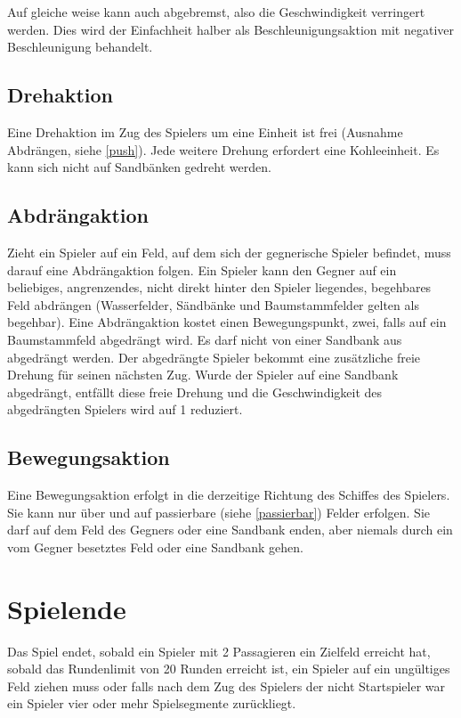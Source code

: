 \documentclass[12pt,a4paper, ngerman, oneside]{scrartcl}
\def\Rundenlimit/{20}
\begin{document}
Auf gleiche weise kann auch abgebremst, also die Geschwindigkeit verringert
werden. Dies wird der Einfachheit halber als Beschleunigungsaktion mit negativer
Beschleunigung behandelt.


\subsection{\label{turn}Drehaktion}

Eine Drehaktion im Zug des Spielers um eine Einheit ist frei (Ausnahme
Abdrängen, siehe \ref{push}). Jede weitere Drehung erfordert eine Kohleeinheit.
Es kann sich nicht auf Sandbänken gedreht werden.


\subsection{\label{push}Abdrängaktion}

Zieht ein Spieler auf ein Feld, auf dem sich der gegnerische Spieler befindet,
muss darauf eine Abdrängaktion folgen. Ein Spieler kann den Gegner auf ein
beliebiges, angrenzendes, nicht direkt hinter den Spieler liegendes, begehbares
Feld abdrängen (\label{passierbar}Wasserfelder, Sändbänke und Baumstammfelder
gelten als begehbar). Eine Abdrängaktion kostet einen Bewegungspunkt, zwei,
falls auf ein Baumstammfeld abgedrängt wird. Es darf nicht von einer Sandbank
aus abgedrängt werden. Der abgedrängte Spieler bekommt eine zusätzliche freie
Drehung für seinen nächsten Zug. Wurde der Spieler auf eine Sandbank abgedrängt,
entfällt diese freie Drehung und die Geschwindigkeit des abgedrängten Spielers
wird auf 1 reduziert.

\subsection{\label{step}Bewegungsaktion}

Eine Bewegungsaktion erfolgt in die derzeitige Richtung des Schiffes des
Spielers. Sie kann nur über und auf passierbare (siehe \ref{passierbar}) Felder
erfolgen. Sie darf auf dem Feld des Gegners oder eine Sandbank enden, aber
niemals durch ein vom Gegner besetztes Feld oder eine Sandbank gehen.

\section{Spielende}

Das Spiel endet, sobald ein Spieler mit 2 Passagieren ein Zielfeld erreicht hat,
sobald das Rundenlimit von \Rundenlimit/ Runden erreicht ist, ein Spieler
auf ein ungültiges Feld ziehen muss oder falls nach dem Zug des Spielers der
nicht Startspieler war ein Spieler vier oder mehr Spielsegmente zurückliegt.
\end{document}
